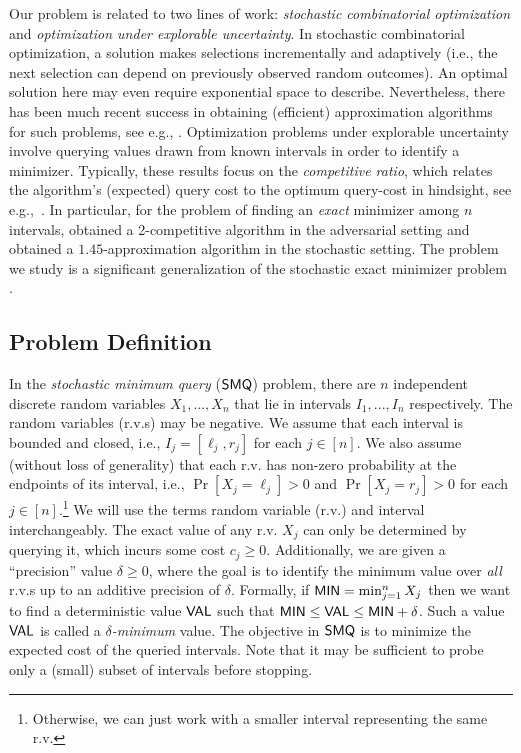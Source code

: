 \documentclass[11pt]{article}
\theoremstyle{remark}
\theoremstyle{plain}
\theoremstyle{remark}
\begin{document}
Our problem is related to two lines of work:  {\em stochastic combinatorial optimization} and  {\em optimization under explorable uncertainty}. In stochastic combinatorial optimization, a solution   makes  selections incrementally and adaptively (i.e., the next selection can depend on previously observed random outcomes). An optimal solution here may even require exponential  space to describe. Nevertheless, there has been much recent success in obtaining (efficient) approximation algorithms for such problems, see  e.g., \cite{DGV08,GuhaM07,BGLMNR12,GuptaKNR15,GkenosisGHK18,INZ12,JiangLL020,HellersteinKP21,HellersteinLS24}.  
Optimization problems under explorable uncertainty  involve querying   values drawn from known intervals in order to identify a minimizer. Typically, these results  focus on the {\em competitive ratio}, which relates the algorithm's (expected) query cost to the  optimum query-cost in hindsight, see e.g.,~\cite{kahan1991model,CHAPLICK2021,feder2000computing,MSTerlebach2008,MSTmegow2017randomization,erlebach2016query,BampisDELMS21,megow2023set}. In particular, for the problem of finding an {\em exact} minimizer among $n$ intervals,  
 \cite{kahan1991model} obtained a 2-competitive algorithm  in the adversarial setting  and \cite{CHAPLICK2021} obtained a $1.45$-approximation algorithm in the stochastic setting.  
 The problem we study is a significant generalization of the stochastic exact minimizer problem \cite{CHAPLICK2021}.
 

\subsection{Problem Definition}
\label{sec:prob}
\def\mv{{\sf MIN}}
\def\vv{{\sf VAL}}
\def\smq{\ensuremath{{\sf SMQ}}\xspace}
\def\smqi{\ensuremath{{\sf SMQI}}\xspace}

In the {\em stochastic minimum query} (\smq) problem, there are $n$ independent discrete random variables  $X_1,...,X_n$  that lie in intervals $I_1,...,I_n$ respectively. The random variables (r.v.s)  may be negative.  We assume that each interval is bounded and closed, i.e., $I_j=[\ell_j,r_j]$ for each $j\in [n]$. We also assume (without loss of generality) that each r.v. has non-zero probability at the endpoints of its interval, i.e., $\Pr[X_j=\ell_j]>0$ and $\Pr[X_j=r_j]>0$  for each $j\in [n]$.\footnote{Otherwise, we can just work with a smaller interval representing the same r.v.}  We will use the terms  random variable (r.v.) and interval interchangeably. The exact value of any  r.v. $X_j$ can only be determined by querying it, which incurs some  cost $c_j\ge 0$. Additionally, we are  given a ``precision'' value $\delta\ge 0$, where  the goal is to identify the minimum value over {\em all} r.v.s up to an additive precision of $\delta$. Formally, if $\mv = \min_{j =1}^n X_j$ then we want to find a  deterministic value $\vv$ such that $\mv \le \vv\le \mv+\delta$. Such a  value $\vv$ is called a {\em $\delta$-minimum} value.  The objective in  \smq is to minimize the expected cost of the queried intervals. 
Note that it may be sufficient to probe only a (small) subset of intervals before stopping. 
\end{document}
